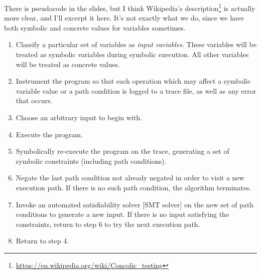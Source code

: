\documentclass[11pt]{article}
\begin{document}
There is pseudocode in the slides, but I think Wikipedia's description\footnote{\url{https://en.wikipedia.org/wiki/Concolic_testing}} is actually more clear, and I'll excerpt it here. It's not exactly what we do, since we have both symbolic and concrete values for variables sometimes.
\begin{enumerate}[noitemsep]
\item    Classify a particular set of variables as \emph{input variables}. These variables will be treated as symbolic variables during symbolic execution. All other variables will be treated as concrete values.
\item    Instrument the program so that each operation which may affect a symbolic variable value or a path condition is logged to a trace file, as well as any error that occurs.
\item    Choose an arbitrary input to begin with.
\item    Execute the program.
\item    Symbolically re-execute the program on the trace, generating a set of symbolic constraints (including path conditions).
\item    Negate the last path condition not already negated in order to visit a new execution path. If there is no such path condition, the algorithm terminates.
\item    Invoke an automated satisfiability solver [SMT solver] on the new set of path conditions to generate a new input. If there is no input satisfying the constraints, return to step 6 to try the next execution path.
\item    Return to step 4.
\end{enumerate}

\end{document}

